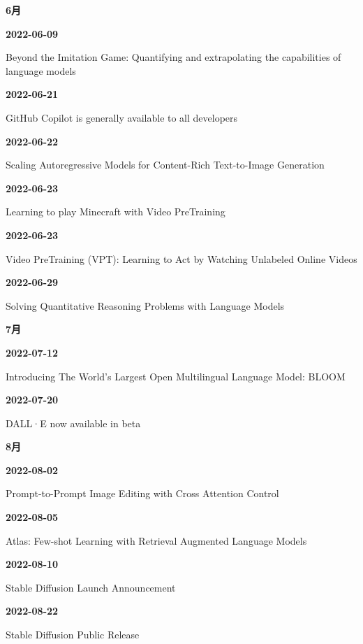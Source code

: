 \smallskip
\medskip
\noindent\textbf{6月}\par
\smallskip
\noindent\textbf{2022-06-09}\par
{\raggedright Beyond the Imitation Game: Quantifying and extrapolating the capabilities of language models\par}
\smallskip
\noindent\textbf{2022-06-21}\par
{\raggedright GitHub Copilot is generally available to all developers\par}
\smallskip
\noindent\textbf{2022-06-22}\par
{\raggedright Scaling Autoregressive Models for Content-Rich Text-to-Image Generation\par}
\smallskip
\noindent\textbf{2022-06-23}\par
{\raggedright Learning to play Minecraft with Video PreTraining\par}
\smallskip
\noindent\textbf{2022-06-23}\par
{\raggedright Video PreTraining (VPT): Learning to Act by Watching Unlabeled Online Videos\par}
\smallskip
\noindent\textbf{2022-06-29}\par
{\raggedright Solving Quantitative Reasoning Problems with Language Models\par}
\smallskip
\medskip
\noindent\textbf{7月}\par
\smallskip
\noindent\textbf{2022-07-12}\par
{\raggedright Introducing The World's Largest Open Multilingual Language Model: BLOOM\par}
\smallskip
\noindent\textbf{2022-07-20}\par
{\raggedright DALL·E now available in beta\par}
\smallskip
\medskip
\noindent\textbf{8月}\par
\smallskip
\noindent\textbf{2022-08-02}\par
{\raggedright Prompt-to-Prompt Image Editing with Cross Attention Control\par}
\smallskip
\noindent\textbf{2022-08-05}\par
{\raggedright Atlas: Few-shot Learning with Retrieval Augmented Language Models\par}
\smallskip
\noindent\textbf{2022-08-10}\par
{\raggedright Stable Diffusion Launch Announcement\par}
\smallskip
\noindent\textbf{2022-08-22}\par
{\raggedright Stable Diffusion Public Release\par}
